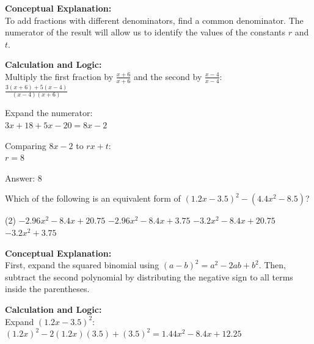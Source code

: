 \documentclass[11pt,paper=a4,answers]{exam}
\begin{document}
\begin{questions}
\begin{solution}
\textbf{Conceptual Explanation:} \\
To add fractions with different denominators, find a common denominator. The numerator of the result will allow us to identify the values of the constants $r$ and $t$.

\vspace{20pt}

\textbf{Calculation and Logic:} \\
Multiply the first fraction by $\frac{x + 6}{x + 6}$ and the second by $\frac{x - 4}{x - 4}$: \\
$\frac{3(x + 6) + 5(x - 4)}{(x - 4)(x + 6)}$

\vspace{10pt}

Expand the numerator: \\
$3x + 18 + 5x - 20 = 8x - 2$

\vspace{10pt}

Comparing $8x - 2$ to $rx + t$: \\
$r = 8$

\vspace{25pt}

Answer: \colorbox{yellow!100}{8}
\end{solution}

\vspace{40pt}

\question
Which of the following is an equivalent form of $(1.2x - 3.5)^2 - (4.4x^2 - 8.5)$?
\begin{tasks}(2)
    \task $-2.96x^2 - 8.4x + 20.75$
    \task $-2.96x^2 - 8.4x + 3.75$
    \task $-3.2x^2 - 8.4x + 20.75$
    \task $-3.2x^2 + 3.75$
\end{tasks}

\begin{solution}
\textbf{Conceptual Explanation:} \\
First, expand the squared binomial using $(a - b)^2 = a^2 - 2ab + b^2$. Then, subtract the second polynomial by distributing the negative sign to all terms inside the parentheses.

\vspace{20pt}

\textbf{Calculation and Logic:} \\
Expand $(1.2x - 3.5)^2$: \\
$(1.2x)^2 - 2(1.2x)(3.5) + (3.5)^2 = 1.44x^2 - 8.4x + 12.25$


\end{solution}
\end{questions}
\end{document}
